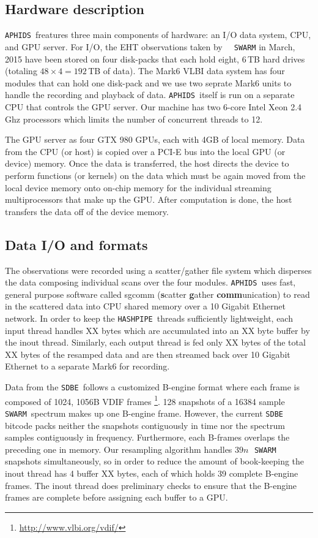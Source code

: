 \documentclass[11pt,preprint]{aastex}
\newcommand{\SWARM}[1]{\texttt{#1\,SWARM}}
\newcommand{\SDBE}{\texttt{SDBE}}
\newcommand{\APHIDS}{\texttt{APHIDS}}
\newcommand{\HASHPIPE}{\texttt{HASHPIPE}}
\begin{document}
\subsection{Hardware description}

\APHIDS\, freatures three main components of hardware: an I/O data system, CPU, and GPU server.  For I/O, the 
EHT observations taken by \SWARM\, in March, 2015 have been stored on four disk-packs that each hold eight, 
6\,TB hard drives (totaling $48 \times 4 = 192$\,TB of data).  The Mark6 VLBI data system has four modules that can hold one disk-pack and we use
two seprate Mark6 units to handle the recording and playback of data.  \APHIDS\, itself is run on a separate CPU 
that controls the GPU server.  Our machine has two 6-core Intel Xeon 2.4 Ghz 
processors which limits the number of concurrent threads to 12.

The GPU server as four GTX 980 GPUs, each with 4GB of local memory.  Data from the CPU (or host) is copied over 
a PCI-E bus into the local GPU (or device) memory.  Once the data is transferred, the host directs the device
to perform functions (or kernels) on the data which must be again moved from the local device memory onto 
on-chip memory for the individual streaming multiprocessors that make up the GPU.  After computation is done, 
the host transfers the data off of the device memory.

\subsection{Data I/O and formats}

The observations were recorded using a scatter/gather file system which disperses the 
data composing individual scans over the four modules.  \APHIDS\, uses fast, general purpose software called 
sgcomm (\textbf{s}catter \textbf{g}ather \textbf{comm}unication) to read in 
the scattered data into CPU shared memory over a 10 Gigabit Ethernet network.  In order to keep the \HASHPIPE\, 
threads sufficiently lightweight, each input thread handles XX bytes which are accumulated into an XX byte 
buffer by the inout thread.  Similarly, each output thread is fed only XX bytes of the total XX bytes of the 
resamped data and are then streamed back over 10 Gigabit Ethernet to a separate Mark6 for recording.

Data from the \SDBE\, follows a customized B-engine format where each
frame is composed of 1024, 1056B VDIF frames \footnote{\url{http://www.vlbi.org/vdif/}}.  128 snapshots of a 
16384 sample \SWARM{}\, spectrum makes up one B-engine frame. However, the current \SDBE\, bitcode packs
neither the snapshots contiguously in time nor the spectrum samples contiguously in frequency.  Furthermore, 
each B-frames overlaps the preceding one in memory.  Our resampling algorithm handles $39n$\,\SWARM{}\, snapshots
simultaneously, so in order to reduce the amount of book-keeping the inout thread has 4 buffer XX bytes, 
each of which holds 39 complete B-engine frames.  The inout thread does preliminary checks to ensure that the 
B-engine frames are complete before assigning each buffer to a GPU.
\end{document}
